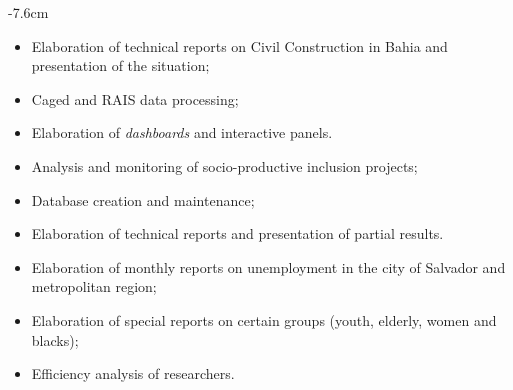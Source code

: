 \documentclass[10pt,a4paper]{cv}
\begin{document}
\tagline{}

\begin{adjustwidth}{}{-7.6cm}
\makecvheader
\end{adjustwidth}




\begin{itemize}
\item Elaboration of technical reports on Civil Construction in Bahia and presentation of the situation;
\item Caged and RAIS data processing;
\item Elaboration of \textit{dashboards} and interactive panels.
\end{itemize}

\divider

\begin{itemize}
\item Analysis and monitoring of socio-productive inclusion projects;
\item Database creation and maintenance;
\item Elaboration of technical reports and presentation of partial results.
\end{itemize}

\divider

\begin{itemize}
	\item Elaboration of monthly reports on unemployment in the city of Salvador and metropolitan region;
	\item Elaboration of special reports on certain groups (youth, elderly, women and blacks);
	\item Efficiency analysis of researchers.
\end{itemize}
\end{document}
